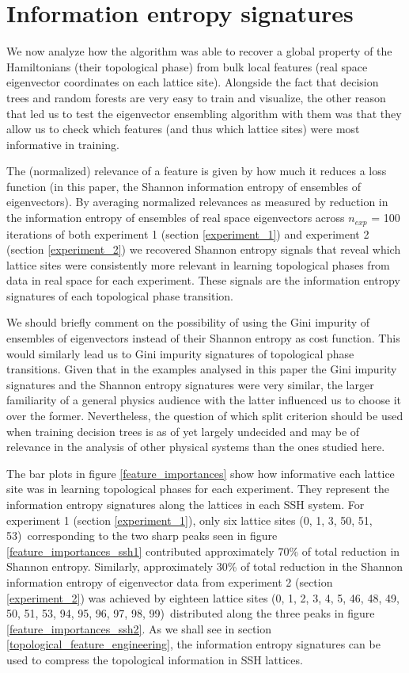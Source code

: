 \documentclass[10pt]{revtex4-1}
\newcommand\sitesExpOne{(0, 1, 3, 50, 51, 53)}
\newcommand\sitesExpTwo{(0, 1, 2, 3, 4, 5, 46, 48, 49, 50, 51, 53, 94, 95, 96, 97, 98, 99)}
\begin{document}
\section{Information entropy signatures}
\label{information_entropy_signatures}

We now analyze how the algorithm was able to recover a global property of the Hamiltonians (their topological phase) from bulk local features (real space eigenvector coordinates on each lattice site). Alongside the fact that decision trees and random forests are very easy to train and visualize, the other reason that led us to test the eigenvector ensembling algorithm with them was that they allow us to check which features (and thus which lattice sites) were most informative in training.

The (normalized) relevance of a feature is given by how much it reduces a loss function (in this paper, the Shannon information entropy of ensembles of eigenvectors). By averaging normalized relevances as measured by reduction in the information entropy of ensembles of real space eigenvectors across $n_{exp}$ = 100 iterations of both experiment 1 (section \ref{experiment_1}) and experiment 2 (section \ref{experiment_2}) we recovered Shannon entropy signals that reveal which lattice sites were consistently more relevant in learning topological phases from data in real space for each experiment. These signals are the information entropy signatures of each topological phase transition. 

We should briefly comment on the possibility of using the Gini impurity of ensembles of eigenvectors \cite{friedman2001elements} instead of their Shannon entropy as cost function. This would similarly lead us to Gini impurity signatures of topological phase transitions. Given that in the examples analysed in this paper the Gini impurity signatures and the Shannon entropy signatures were very similar, the larger familiarity of a general physics audience with the latter influenced us to choose it over the former. Nevertheless, the question of which split criterion  should be used when training decision trees is as of yet largely undecided \cite{raileanu2004theoretical} and may be of relevance in the analysis of other physical systems than the ones studied here.       

The bar plots in figure \ref{feature_importances} show how informative each lattice site was in learning topological phases for each experiment. They represent the information entropy signatures along the lattices in each SSH system. For experiment 1 (section \ref{experiment_1}), only six lattice sites \sitesExpOne\ corresponding to the two sharp peaks seen in figure \ref{feature_importances_ssh1} contributed approximately 70\% of total reduction in Shannon entropy. Similarly, approximately 30\% of total reduction in the Shannon information entropy of eigenvector data from experiment 2 (section \ref{experiment_2}) was achieved by eighteen lattice sites \sitesExpTwo\ distributed along the three peaks in figure \ref{feature_importances_ssh2}. As we shall see in section \ref{topological_feature_engineering}, the information entropy signatures can be used to compress the topological information in SSH lattices.
\end{document}
